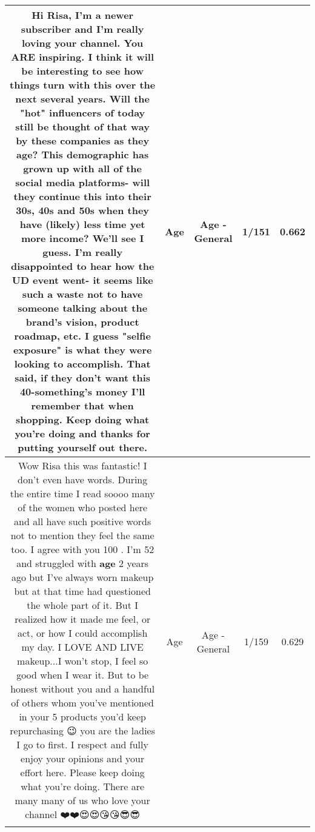 \documentclass[11pt]{article}
\newlength\mylength
\begin{document}
\begin{center}
\begin{longtable}{|C{.65\mylength}|C{.30\mylength}|C{.12\mylength}|C{.12\mylength}|C{.12\mylength}|}
  \small Hi Risa,  I'm a newer subscriber and I'm really loving your channel. You ARE inspiring.  I think it will be interesting to see how things turn with this over the next several years.  Will the "hot" influencers of today still be thought of that way by these companies as they \textbf{age}? This demographic has grown up with all of the social media platforms- will they continue this into their 30s, 40s and 50s when they have (likely) less time yet more income?  We'll see I guess.  I'm really disappointed to hear how the UD event went- it seems like such a waste not to have someone talking about the brand's vision, product roadmap, etc.  I guess "selfie exposure" is what they were looking to accomplish.  That said, if they don't want this 40-something's money I'll remember that when shopping. Keep doing what you're doing and thanks for putting yourself out there.\normalsize   & Age & Age - General & 1/151 & 0.662 \\  \hline
  \small Wow Risa this was fantastic!  I don't even have words.  During the entire time I read soooo many of the women who posted here and all have such positive words not to mention they feel the same too. I agree with you 100 .  I'm 52 and struggled with \textbf{age} 2 years ago but I've always worn makeup but at that time had questioned the whole part of it. But I realized how it made me feel, or act, or how I could accomplish my day.  I LOVE AND LIVE makeup...I won't stop, I feel so good when I wear it.  But to be honest without you and a handful of others whom you've mentioned in your 5 products you'd keep repurchasing 😉  you are the ladies I go to first.  I respect and fully enjoy your opinions and your effort here.  Please keep doing what you're doing.  There are many many of us who love your channel ❤️❤️😍😍😘😘😎😎\normalsize   & Age & Age - General & 1/159 & 0.629 \\  \hline

\end{longtable}
\end{center}
\end{document}
